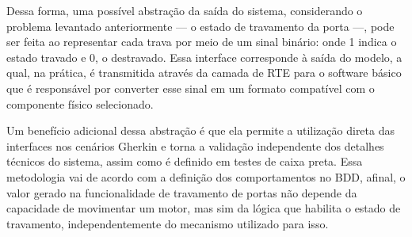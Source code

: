 Dessa forma, uma possível abstração da saída do sistema, considerando o problema levantado anteriormente — o estado de travamento da porta —, pode ser feita ao 
representar cada trava por meio de um sinal binário: onde 1 indica o estado travado e 0, o destravado. Essa interface corresponde à saída do modelo, a qual, na 
prática, é transmitida através da camada de RTE para o software básico que é responsável por converter esse sinal em um formato compatível com o componente físico 
selecionado.

Um benefício adicional dessa abstração é que ela permite a utilização direta das interfaces nos cenários Gherkin e torna a validação independente dos detalhes 
técnicos do sistema, assim como é definido em testes de caixa preta. Essa metodologia vai de acordo com a definição dos comportamentos no BDD, afinal, o valor 
gerado na funcionalidade de travamento de portas não depende da capacidade de movimentar um motor, mas sim da lógica que habilita o estado de travamento, 
independentemente do mecanismo utilizado para isso.